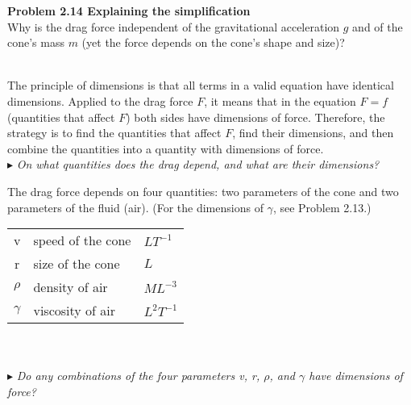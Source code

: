 \documentclass[a4paper]{book}
\begin{document}
\colorbox{light-gray}{
\begin{minipage}{\textwidth}
{\bf Problem 2.14 Explaining the simplification}\\
Why is the drag force independent of the gravitational acceleration $g$ and of the
cone’s mass $m$ (yet the force depends on the cone’s shape and size)?
\end{minipage}
}\\

\noindent The principle of dimensions is that all terms in a valid equation have identical dimensions. Applied to the drag force $F$, it means that in the equation $F = f$ (quantities that affect $F$) both sides have dimensions of force. Therefore, the strategy is to find the quantities that affect $F$, find their dimensions, and then combine the quantities into a quantity with dimensions of force.\\

\noindent $\blacktriangleright$ {\it On what quantities does the drag depend, and what are their dimensions?}\\ 

\noindent
\begin{minipage}[t]{65mm}
The drag force depends on four quantities: two parameters of the cone and two parameters of the fluid (air). (For the dimensions of $\gamma$, see Problem 2.13.)
\end{minipage}
\hfill
\begin{minipage}[t]{50mm}
\begin{tabular}[t]{|c|l|l|}
v & speed of the cone & $LT^{−1}$\\
r & size of the cone & $L$\\
$\rho$ & density of air & $ML^{−3}$\\
$\gamma$ & viscosity of air & $L^2T^{−1}$\\
\end{tabular}
\end{minipage}\\
\\

\noindent $\blacktriangleright$ {\it Do any combinations of the four parameters
v, r, $\rho$, and $\gamma$ have dimensions of force?}\\ 
\end{document}
